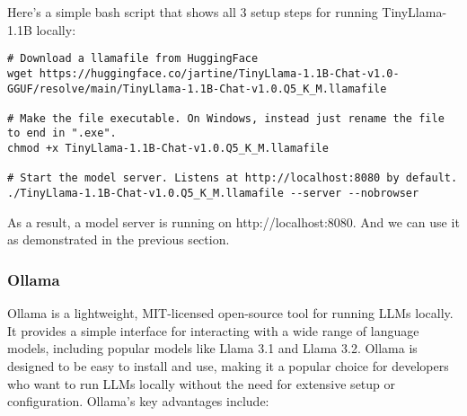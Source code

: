 Here's a simple bash script that shows all 3 setup steps for running TinyLlama-1.1B locally:

\begin{verbatim}
# Download a llamafile from HuggingFace
wget https://huggingface.co/jartine/TinyLlama-1.1B-Chat-v1.0-GGUF/resolve/main/TinyLlama-1.1B-Chat-v1.0.Q5_K_M.llamafile

# Make the file executable. On Windows, instead just rename the file to end in ".exe".
chmod +x TinyLlama-1.1B-Chat-v1.0.Q5_K_M.llamafile

# Start the model server. Listens at http://localhost:8080 by default.
./TinyLlama-1.1B-Chat-v1.0.Q5_K_M.llamafile --server --nobrowser
\end{verbatim}

As a result, a model server is running on http://localhost:8080. And we can use it as demonstrated in the previous section.

\subsubsection{Ollama}

Ollama is a lightweight, MIT-licensed open-source tool for running LLMs locally. It provides a simple interface for interacting with a wide range of language models, including popular models like Llama 3.1 and Llama 3.2. Ollama is designed to be easy to install and use, making it a popular choice for developers who want to run LLMs locally without the need for extensive setup or configuration. Ollama's key advantages include:

